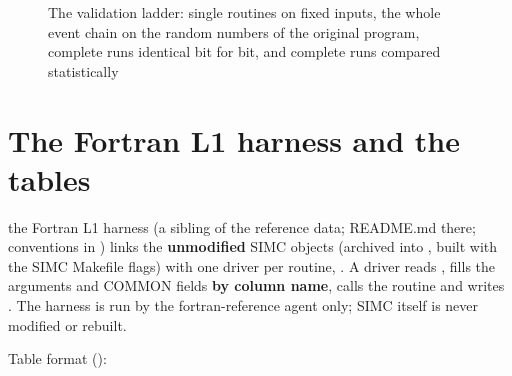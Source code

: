 \begin{figure}[htbp]
\caption[The validation ladder]{The validation ladder: single routines on fixed inputs, the whole event chain on the random numbers of the original program, complete runs identical bit for bit, and complete runs compared statistically}\label{fig:validationu5fladder}
\end{figure}
\section{\texorpdfstring{The Fortran L1 harness and the tables}{The Fortran L1 harness and the tables}}\label{translation_report-02u5fvalidation:21-the-fortran-l1-harness-and-the-tables}
the Fortran L1 harness  (a sibling of the reference data; README.md there; conventions in ) links the
\textbf{unmodified} SIMC objects (archived into , built with the SIMC Makefile flags) with one driver per
routine, . A driver reads , fills the arguments and COMMON fields \textbf{by column
name}, calls the routine and writes . The harness is run by the fortran-reference agent only; SIMC itself
is never modified or rebuilt.

Table format ():

